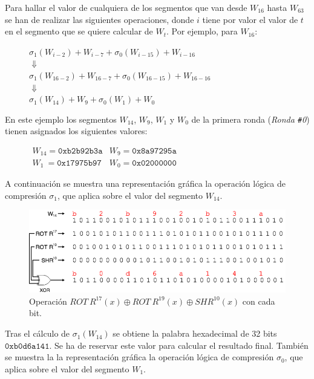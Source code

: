 \documentclass{article}
\begin{document}
    Para hallar el valor de cualquiera de los segmentos que van desde $W_{16}$ hasta $W_{63}$ se han de realizar las siguientes operaciones, donde $i$ tiene por valor el valor de $t$ en el segmento que se quiere calcular de $W_t$. Por ejemplo, para $W_{16}$:
    
    \begin{figure}[H]
    \centering
        $\sigma_{1}(W_{i-2})+W_{i-7}+\sigma_{0}(W_{i-15})+W_{i-16}$ \\
        $\Downarrow$ \\
        $\sigma_{1}(W_{16-2})+W_{16-7}+\sigma_{0}(W_{16-15})+W_{16-16}$ \\
        $\Downarrow$ \\
        $\sigma_{1}(W_{14})+W_{9}+\sigma_{0}(W_{1})+W_{0}$
    \end{figure}
    
    En este ejemplo los segmentos $W_{14}$, $W_{9}$, $W_{1}$ y $W_{0}$ de la primera ronda (\textit{Ronda \texttt{\#}0}) tienen asignados los siguientes valores:
    \begin{figure}[H]
    \centering
        $\begin{array}{rl}
            W_{14} = \texttt{0xb2b92b3a} & W_{9} = \texttt{0x8a97295a} \\
            W_{1}\  = \texttt{0x17975b97} & W_{0} = \texttt{0x02000000}
        \end{array}$
    \end{figure}
    
    A continuación se muestra una representación gráfica la operación lógica de compresión $\sigma_{1}$, que aplica sobre el valor del segmento $W_{14}$.
    
    \begin{figure}[H]
    \centering
        \includegraphics[scale=0.445]{img/SHA-256-Wt_operacion_sigma1.png}
        \caption{Operación $ROT \ R^{17}(x) \oplus ROT \ R^{19}(x) \oplus SHR^{10}(x)$ con cada bit.}
    \end{figure}
    
    Tras el cálculo de $\sigma_{1}(W_{14})$ se obtiene la palabra hexadecimal de 32 bits $\texttt{0xb0d6a141}$. Se ha de reservar este valor para calcular el resultado final. También se muestra la la representación gráfica la operación lógica de compresión $\sigma_{0}$, que aplica sobre el valor del segmento $W_{1}$.
    
\end{document}
